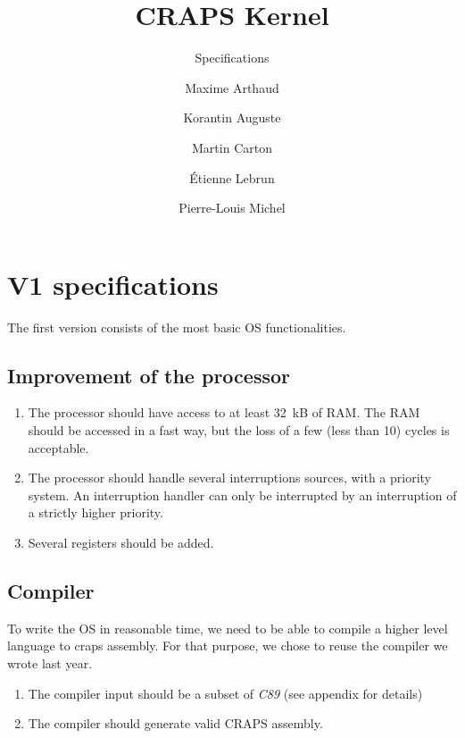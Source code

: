 \documentclass{article}
\title{CRAPS Kernel}
\subtitle{Specifications}
\author{
       Maxime Arthaud
  \and Korantin Auguste
  \and Martin Carton
  \and Étienne Lebrun
  \and Pierre-Louis Michel
}
\begin{document}
  
  \newpage
    \section{V1 specifications}
    The first version consists of the most basic OS functionalities. 
      \subsection{Improvement of the processor}
        \begin{enumerate}
          \item The processor should have access to at least \SI{32}{kB} of RAM.
            The RAM should be accessed in a fast way, but the loss of a few
            (less than 10) cycles is acceptable.
          \item The processor should handle several interruptions sources, with
            a priority system. An interruption handler can only be interrupted
            by an interruption of a strictly higher priority.
          \item Several registers should be added.
   
        \end{enumerate}

      \subsection{Compiler}
        To write the OS in reasonable time, we need to be able to compile a
        higher level language to craps assembly. For that purpose, we chose to
        reuse the compiler we wrote last year.
        \begin{enumerate}     
            \item The compiler input should be a subset of \textit{C89}
                (see appendix for details)
          \item The compiler should generate valid CRAPS assembly.
        \end{enumerate}
\end{document}
